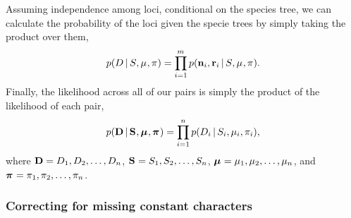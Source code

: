 \begin{linenomath}
Assuming independence among loci, conditional on the species tree, we can
calculate the probability of the \nloci loci given the specie trees by simply
taking the product over them,
\begin{equation}
    \pr(\comparisondata \given \sptree, \murate, \gfreq)
    =
    \prod_{i=1}^{\nloci}
    \pr(\leafallelecounts[i], \leafredallelecounts[i] \given \sptree, \murate, \gfreq).
    \label{eq:comparisonlikelihood}
\end{equation}
Finally, the likelihood across all of our pairs is simply the product of the
likelihood of each pair,
\begin{equation}
    \pr(
    \alldata
    \given
    \sptrees,
    \murates,
    \gfreqs)
    =
    \prod_{i=1}^{\ncomparisons}
    \pr(\comparisondata[i] \given \sptree[i], \murate[i], \gfreq[i]),
    \label{eq:collectionlikelihood}
\end{equation}
where
$\alldata = \comparisondata[1], \comparisondata[2], \ldots, \comparisondata[\ncomparisons]$,
$\sptrees = \sptree[1], \sptree[2], \ldots, \sptree[\ncomparisons]$,
$\murates = \murate[1], \murate[2], \ldots, \murate[\ncomparisons]$,
and
$\gfreqs = \gfreq[1], \gfreq[2], \ldots, \gfreq[\ncomparisons]$.
\end{linenomath}

\subsubsection{Correcting for missing constant characters}

